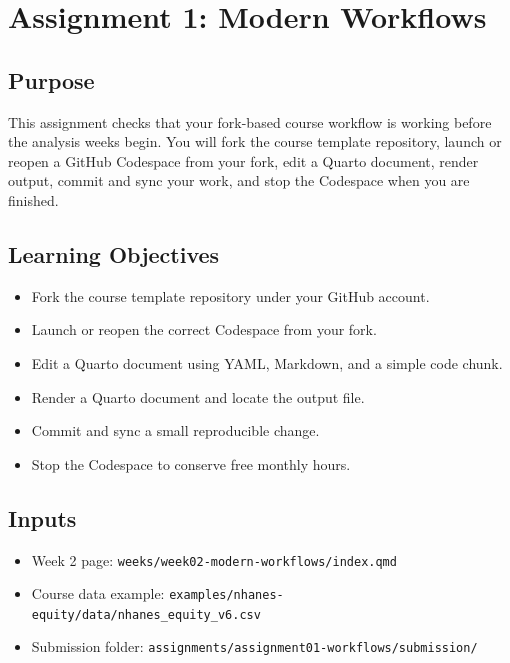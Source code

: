 \documentclass[
  letterpaper,
  DIV=11,
  numbers=noendperiod,
  oneside]{scrreprt}
\providecommand{\tightlist}{%
  \setlength{\itemsep}{0pt}\setlength{\parskip}{0pt}}
\begin{document}
\chapter{Assignment 1: Modern
Workflows}\label{assignment-1-modern-workflows}

\section{Purpose}\label{purpose-3}

This assignment checks that your fork-based course workflow is working
before the analysis weeks begin. You will fork the course template
repository, launch or reopen a GitHub Codespace from your fork, edit a
Quarto document, render output, commit and sync your work, and stop the
Codespace when you are finished.

\section{Learning Objectives}\label{learning-objectives-2}

\begin{itemize}
\tightlist
\item
  Fork the course template repository under your GitHub account.
\item
  Launch or reopen the correct Codespace from your fork.
\item
  Edit a Quarto document using YAML, Markdown, and a simple code chunk.
\item
  Render a Quarto document and locate the output file.
\item
  Commit and sync a small reproducible change.
\item
  Stop the Codespace to conserve free monthly hours.
\end{itemize}

\section{Inputs}\label{inputs-2}

\begin{itemize}
\tightlist
\item
  Week 2 page: \texttt{weeks/week02-modern-workflows/index.qmd}
\item
  Course data example:
  \texttt{examples/nhanes-equity/data/nhanes\_equity\_v6.csv}
\item
  Submission folder:
  \texttt{assignments/assignment01-workflows/submission/}
\end{itemize}
\end{document}

